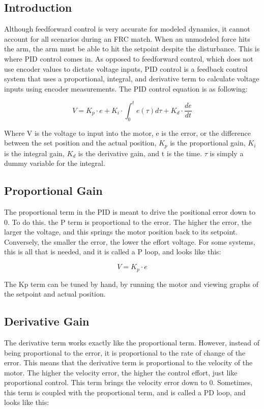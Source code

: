 \documentclass{scrartcl}
\begin{document}
\subsection{Introduction}
Although feedforward control is very accurate for modeled dynamics, it cannot account for all scenarios during an FRC match. When an unmodeled force hits the arm, the arm must be able to hit the setpoint despite the disturbance. This is where PID control comes in. As opposed to feedforward control, which does not use encoder values to dictate voltage inputs, PID control is a feedback control system that uses a proportional, integral, and derivative term to calculate voltage inputs using encoder measurements. The PID control equation is as following:

\begin{equation} \label{PID Control Equation}
    V = K_p \cdot e + K_i \cdot \int_{0}^{t} e(\tau) d\tau + K_d \cdot \frac{de}{dt}
\end{equation}

Where V is the voltage to input into the motor, e is the error, or the difference between the set position and the actual position, \(K_p\) is the proportional gain, \(K_i\) is the integral gain, \(K_d\) is the derivative gain, and t is the time. \(\tau\) is simply a dummy variable for the integral.

\subsection{Proportional Gain}
The proportional term in the PID is meant to drive the positional error down to 0. To do this. the P term is proportional to the error. The higher the error, the larger the voltage, and this springs the motor position back to its setpoint. Conversely, the smaller the error, the lower the effort voltage. For some systems, this is all that is needed, and it is called a P loop, and looks like this:

\begin{equation} \label{P Loop}
    V = K_p \cdot e
\end{equation}

The Kp term can be tuned by hand, by running the motor and viewing graphs of the setpoint and actual position.

\subsection{Derivative Gain}
The derivative term works exactly like the proportional term. However, instead of being proportional to the error, it is proportional to the rate of change of the error. This means that the derivative term is proportional to the velocity of the motor. The higher the velocity error, the higher the control effort, just like proportional control. This term brings the velocity error down to 0. Sometimes, this term is coupled with the proportional term, and is called a PD loop, and looks like this:
\end{document}

